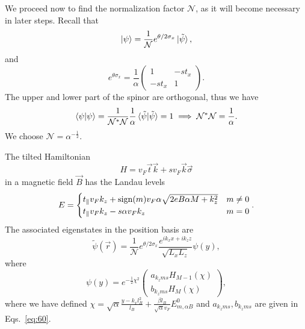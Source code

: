 We proceed now to find the normalization factor \( \mathcal{N} \), as it will become necessary in later steps.
Recall that
\[
  \ket{\psi} = \frac{1}{\mathcal{N}} e^{\theta /2 \sigma _x} \ket{\tilde{\psi}},
\]
and
\[
e^{\theta \sigma _x} =
\frac{1}{\alpha }
\begin{pmatrix}
  1 & -s t_x\\
  -s t_x & 1
\end{pmatrix}.
\]
The upper and lower part of the spinor are orthogonal, thus we have
\begin{equation}
  \label{eq:61}
  \braket{\psi  | \psi } = \frac{1}{\mathcal{N}^{*} \mathcal{N}} \frac{1}{\alpha } \braket{\tilde{\psi}  | \tilde{\psi} } = 1 \implies \mathcal{N}^{*}\mathcal{N} = \frac{1}{\alpha }.
\end{equation}
We choose \( \mathcal{N} = \alpha^{-\frac{1}{2}} \).

\begin{Proposition}
  The tilted Hamiltonian
  \[
    H = v_F \vec{t} \vec{k} + s v_F \vec{k} \vec{\sigma}
  \]
  in a magnetic field \( \vec{B} \) has the Landau levels
  \[
    E =
    \begin{cases}
      t_{\parallel} v_F k_z + \operatorname{sign}(m) v_F \alpha \sqrt{2 e B \alpha M + k_{z} ^2} & m \neq 0\\
      t_{\parallel} v_F k_z - s \alpha v_F k_z & m = 0
    \end{cases}.
  \]
  The associated eigenstates in the position basis are
  \[
    \tilde{\psi}(\vec{r}) = \frac{1}{\mathcal{N}} e^{\theta /2 \sigma_x}
    \frac{
      e^{ik_{x} x + ik_{z} z}
    }{
      \sqrt{L_{x}  L_z}
    } \psi(y),
    \]
    where
    \[
      \psi(y) = e^{-\frac{1}{2} \chi^2}
      \begin{pmatrix}
        a_{k_z m s} H_{M - 1} (\chi) \\
        b_{k_z m s} H_M (\chi)
      \end{pmatrix},
    \]
    where we have defined \( \chi = \sqrt{\alpha} \frac{ y - k_x l_B^2 }{l_{B}} + \frac{\beta l_B}{\sqrt{\alpha} v_{F}} E^0_{m, \alpha B} \) and \( a_{k_z m s}, b_{k_z m s} \) are given in Eqs.~\eqref{eq:60}.
\end{Proposition}

